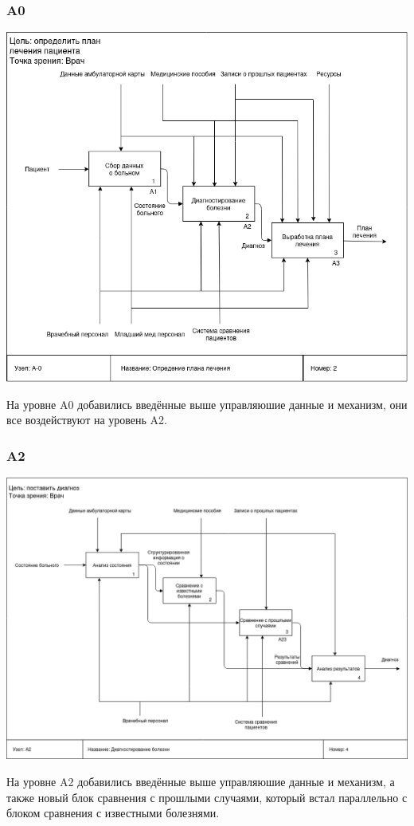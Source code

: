 \documentclass[a4paper, 12pt]{article}
\begin{document}
\subsubsection{A0}
\begin{center}
  \centering
  \includegraphics[width=1\linewidth]{extra/to-be_A0.png}
  \label{fig:prplot}
\end{center}
На уровне A0 добавились введённые выше управляюшие данные и механизм, они все воздействуют на уровень A2.
\subsubsection{A2}
\begin{center}
  \centering
  \includegraphics[width=1\linewidth]{extra/to-be_A2.png}
  \label{fig:prplot}
\end{center}
На уровне A2 добавились введённые выше управляюшие данные и механизм, а также новый блок сравнения с прошлыми случаями, который встал параллельно с блоком сравнения с известными болезнями.
\end{document}
